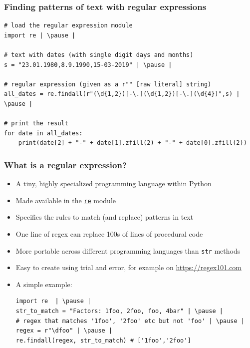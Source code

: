 \documentclass[xcolor=table]{beamer}
\begin{document}
\begin{frame}[fragile]
\frametitle{Finding patterns of text with regular expressions}
\begin{lstlisting}[style=python]
# load the regular expression module
import re | \pause |

# text with dates (with single digit days and months)
s = "23.01.1980,8.9.1990,15-03-2019" | \pause |

# regular expression (given as a r"" [raw literal] string)
all_dates = re.findall(r"(\d{1,2})[-\.](\d{1,2})[-\.](\d{4})",s) | \pause |

# print the result
for date in all_dates:
    print(date[2] + "-" + date[1].zfill(2) + "-" + date[0].zfill(2)) 
\end{lstlisting}
\end{frame}
\begin{frame}[fragile]
\frametitle{What is a regular expression?}
    \begin{itemize}
        \item A tiny, highly specialized programming language within Python \pause 
        \item Made available in the \href{https://docs.python.org/3.7/library/re.html#module-re}{\texttt{re}} module \pause
        \item Specifies the rules to match (and replace) patterns in text \pause 
        \item One line of regex can replace 100s of lines of procedural code \pause 
        \item More portable across different programming languages than \texttt{str} methods \pause 
        \item Easy to create using trial and error, for example on \url{https://regex101.com} \pause 
        \item A simple example:
\begin{lstlisting}[style=python]
import re  | \pause |
str_to_match = "Factors: 1foo, 2foo, foo, 4bar" | \pause |
# regex that matches '1foo', '2foo' etc but not 'foo' | \pause |
regex = r"\dfoo" | \pause |  
re.findall(regex, str_to_match) # ['1foo','2foo']
\end{lstlisting}
    \end{itemize}
\end{frame}
\end{document}
